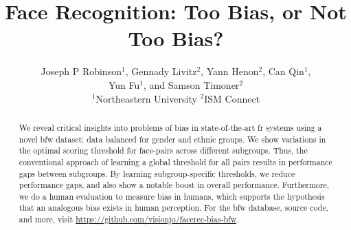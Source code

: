 \documentclass[10pt,twocolumn,letterpaper]{article}
\begin{document}
\title{Face Recognition: Too Bias, or Not Too Bias?}

\author{\parbox{16cm}{\centering
    {\large Joseph P Robinson$^1$, Gennady Livitz$^2$, Yann Henon$^2$, Can Qin$^1$,\\ Yun Fu$^1$, and Samson Timoner$^2$}\\
    {\normalsize
    \hspace{-.4in}$^{1}$Northeastern University\hspace{.7in} $^{2}$ISM Connect}}
}


\maketitle

\begin{abstract}
We reveal critical insights into problems of bias in state-of-the-art \gls{fr} systems using a novel \gls{bfw} dataset: data balanced for gender and ethnic groups. We show variations in the optimal scoring threshold for face-pairs across different subgroups. Thus, the conventional approach of learning a  global threshold for all pairs results in performance gaps between subgroups. By learning subgroup-specific thresholds, we reduce performance gaps, and also show a notable boost in overall performance. Furthermore, we do a human evaluation to measure bias in humans, which supports the hypothesis that an analogous bias exists in human perception. For the \gls{bfw} database, source code, and more, visit \href{https://github.com/visionjo/facerec-bias-bfw}{https://github.com/visionjo/facerec-bias-bfw}.
\end{abstract}




\end{document}
